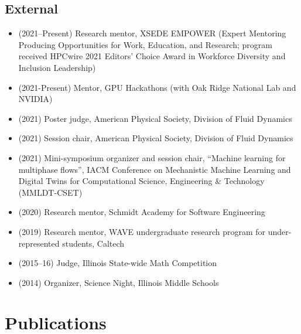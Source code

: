 \subsection{External}
\begin{itemize}
    \item (2021--Present) Research mentor, XSEDE EMPOWER (Expert Mentoring Producing Opportunities for Work, Education, and Research; program received HPCwire 2021 Editors' Choice Award in Workforce Diversity and Inclusion Leadership)
    \item (2021-Present) Mentor, GPU Hackathons (with Oak Ridge National Lab and NVIDIA)
    \item (2021) Poster judge, American Physical Society, Division of Fluid Dynamics
    \item (2021) Session chair, American Physical Society, Division of Fluid Dynamics
    \item (2021) Mini-symposium organizer and session chair, ``Machine learning for multiphase flows'', IACM Conference on Mechanistic Machine Learning and Digital Twins for Computational Science, Engineering \& Technology (MMLDT-CSET)
    \item (2020) Research mentor, Schmidt Academy for Software Engineering
    \item (2019) Research mentor, WAVE undergraduate research program for under-represented students, Caltech
    \item (2015--16) Judge, Illinois State-wide Math Competition
    \item (2014) Organizer, Science Night, Illinois Middle Schools
\end{itemize}

\section{Publications}

\nocite{*}

\newrefcontext[labelprefix=P]
\printbibliography[type=unpublished,title={Preprints},resetnumbers=true,heading=subbibnumbered]

\newrefcontext[labelprefix=J]
\printbibliography[type=article,title={Journal papers},resetnumbers=true,heading=subbibnumbered]

\newrefcontext[labelprefix=C]
\printbibliography[type=inproceedings,title={Refereed conference papers},resetnumbers=true,heading=subbibnumbered]

\newrefcontext[labelprefix=O]
\printbibliography[title={Other publications},resetnumbers=true,filter=other,heading=subbibnumbered]

